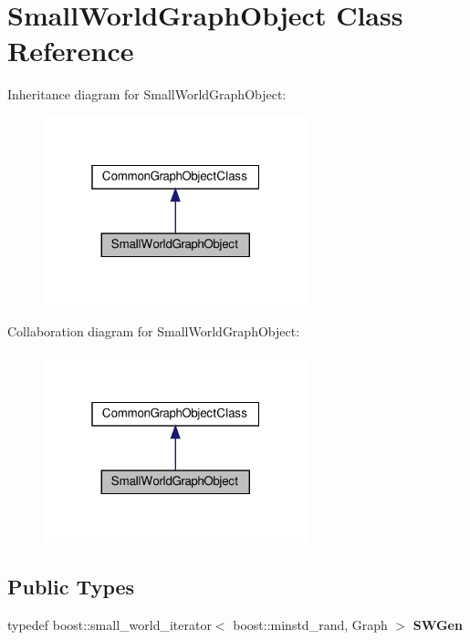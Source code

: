 \hypertarget{classSmallWorldGraphObject}{}\section{Small\+World\+Graph\+Object Class Reference}
\label{classSmallWorldGraphObject}


Inheritance diagram for Small\+World\+Graph\+Object\+:
\nopagebreak
\begin{figure}[H]
\begin{center}
\leavevmode
\includegraphics[width=217pt]{classSmallWorldGraphObject__inherit__graph}
\end{center}
\end{figure}


Collaboration diagram for Small\+World\+Graph\+Object\+:
\nopagebreak
\begin{figure}[H]
\begin{center}
\leavevmode
\includegraphics[width=217pt]{classSmallWorldGraphObject__coll__graph}
\end{center}
\end{figure}
\subsection*{Public Types}
\begin{DoxyCompactItemize}
\item 
\mbox{\label{classSmallWorldGraphObject_acb009e184bb1bee17aef9cbc5b3e3793}} 
typedef boost\+::small\+\_\+world\+\_\+iterator$<$ boost\+::minstd\+\_\+rand, Graph $>$ {\bfseries S\+W\+Gen}
\end{DoxyCompactItemize}
